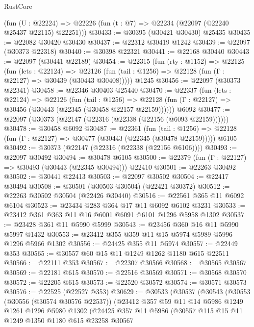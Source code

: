 \begin{lexlean}{RustCore}
\begin{coremodule}
    (fun (U : @22224) => @22226 (fun (t : @7) => @22234 (@22097 (@22240 @25437 @22115) @22251)))
@30433 := @30395 (@30421 @30430) @25435
@30435 := @22082 @30420 @30430
@30437 := @22312 @30419 @1242
@30439 := @22097 (@30373 @22318)
@30440 := @30398 @22321
@30441 := @22168 @30440
@30443 := @22097 (@30441 @22189)
@30454 := @22315
    (fun (rty : @1152) =>
    @22125
      (fun (lets : @22124) =>
      @22126 (fun (tail : @1256) => @22128 (fun (Γ : @22127) => @30439 (@30443 @30408)))))
    @1245
@30456 := @22097 (@30373 @22341)
@30458 := @22346 @30403 @25440
@30470 := @22337
    (fun (lets : @22124) =>
    @22126
      (fun (tail : @1256) =>
      @22128 (fun (Γ : @22127) => @30456 (@30443 (@22345 (@30458 @22157 @22159))))))
    @6092
@30477 := @22097 (@30373 (@22147 (@22316 (@22338 (@22156 (@6093 @22159))))))
@30478 := @30458 @6092
@30487 := @22361
    (fun (tail : @1256) => @22128 (fun (Γ : @22127) => @30477 (@30443 (@22345 (@30478 @22159)))))
    @6105
@30492 := @30373 (@22147 (@22316 (@22338 (@22156 @6106))))
@30493 := @22097 @30492
@30494 := @30478 @6105
@30500 := @22379 (fun (Γ : @22127) => @30493 (@30443 (@22345 @30494))) @22410
@30501 := @22263 @30492
@30502 := @30441 @22413
@30503 := @22097 @30502
@30504 := @22417 @30494
@30508 := @30501 (@30503 @30504) (@22421 @30372)
@30512 := @22263 @30502 @30504 (@22426 @30440)
@30516 := @22561 @365 @11 @6092 @6104
@30523 := @23434 @283 @364 @17 @11 @6092 @6102 @3231
@30533 := @23412 @361 @363 @11 @16 @6001 @6091 @6101 @1296 @5958 @1302
@30537 := @23428 @361 @11 @5990 @5999
@30543 := @23456 @360 @16 @11 @5990 @5997 @1432
@30553 := @23412 @355 @359 @11 @15 @5974 @5989 @5996 @1296 @5966 @1302
@30556 := @24425 @355 @11 @5974
@30557 := @22449 @353
@30565 := @30557 @60 @15 @11 @1249 @1262 @1180 @615 @22511
@30566 := @22111 @353
@30567 := @22307 @30566
@30568 := @30565 @30567
@30569 := @22181 @615
@30570 := @22516 @30569
@30571 := @30568 @30570
@30572 := @22205 @615
@30573 := @22520 @30572
@30574 := @30571 @30573
@30576 := @22525 (@22527 @353)
@30629 := @30533
    (@30537
      (@30543
        (@30553
          (@30556 (@30574 @30576 @22537))
          (@23412
            @357
            @59
            @11
            @14
            @5986
            @1249
            @1261
            @1296
            @5980
            @1302
            (@24425
              @357
              @11
              @5986
              (@30557
                @115
                @15
                @11
                @1249
                @1350
                @1180
                @615
                @23258
                @30567

\end{coremodule}
\end{lexlean}
